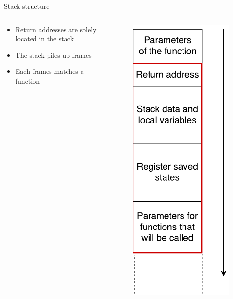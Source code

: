 \documentclass{beamer}
\begin{document}
\begin{frame}[c]{Stack structure}
	\begin{columns}
		\begin{column}{0.55\textwidth}
		\begin{itemize}\itemsep20pt
				\item Return addresses are solely located in the stack
				\item The stack piles up frames
				\item Each frames matches a function
			\end{itemize}
		\end{column}
		\begin{column}{0.45\textwidth}
			\begin{figure}
			\centering
			\includegraphics[height=0.75\textheight]{images/stack_layout.pdf}

\end{figure}
\end{column}
\end{columns}
\end{frame}
\end{document}
